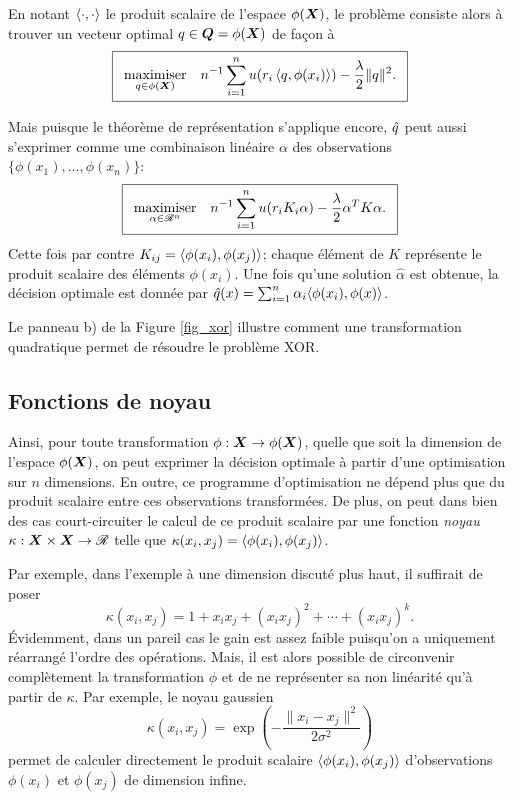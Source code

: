 En notant $\inp{\cdot,\cdot}$ le produit scalaire de l'espace $\phi(\X)$, le problème consiste alors
à trouver un vecteur optimal $q \in \Q = \phi(\X)$ de façon à
{\begin{equation}
    \boxed{
      \maximizeEquation[q\in\phi(\X)]{n^{-1}\sumi u(r_i\,\inp{q,\phi(x_i)}) - \frac{\lambda}{2}\|q\|^2.}}
  \end{equation}
  \vspace{-\baselineskip}}

Mais puisque le théorème de représentation s'applique encore, $\qh$ peut aussi s'exprimer
comme une combinaison linéaire $\alpha$ des observations $\{\phi(x_1) ,\ldots, \phi(x_n)\}$:
{\begin{equation}
\boxed{
  \maximizeEquation[\alpha \in \Re^n]{n^{-1}\sumi u(r_iK_i\alpha) - \frac{\lambda}{2}\alpha^TK\alpha.}}
\end{equation}
\vspace{-\baselineskip}}
Cette fois par contre $K_{ij} = \inp{\phi(x_i),\phi(x_j)}$; chaque élément de $K$ représente le
produit scalaire des éléments $\phi(x_i)$. Une fois qu'une solution $\hat\alpha$ est obtenue, la
décision optimale est donnée par $\qh(x) = \sumi \alpha_i\langle\phi(x_i),\phi(x)\rangle$. 

Le panneau b) de la Figure \ref{fig_xor} illustre comment une transformation quadratique
permet de résoudre le problème XOR.


\subsection{Fonctions de noyau}

Ainsi, pour toute transformation $\phi:\X\to\phi(\X)$, quelle que soit la dimension de l'espace
$\phi(\X)$, on peut exprimer la décision optimale à partir d'une optimisation sur $n$
dimensions. En outre, ce programme d'optimisation ne dépend plus que du produit scalaire
entre ces observations transformées. De plus, on peut dans bien des cas court-circuiter le
calcul de ce produit scalaire par une fonction \textit{noyau} $\kappa:\X\times\X \to \Re$ telle que
$\kappa(x_i,x_j) = \inp{\phi(x_i),\phi(x_j)}$.

Par exemple, dans l'exemple à une dimension discuté plus haut, il suffirait de poser
\begin{equation}
  \kappa(x_i,x_j) = 1 + x_ix_j + (x_ix_j)^2 + \cdots + (x_ix_j)^k.
\end{equation}
Évidemment, dans un pareil cas le gain est assez faible puisqu'on a uniquement réarrangé
l'ordre des opérations. Mais, il est alors possible de circonvenir complètement la
transformation $\phi$ et de ne représenter sa non linéarité qu'à partir de $\kappa$. Par exemple,
le noyau gaussien
\begin{equation}
  \kappa(x_i,x_j) = \exp\left(-\frac{\|x_i-x_j\|^2}{2\sigma^2}\right)
\end{equation}
permet de calculer directement le produit scalaire $\inp{\phi(x_i),\phi(x_j)}$ d'observations
$\phi(x_i)$ et $\phi(x_j)$ de dimension infine.

